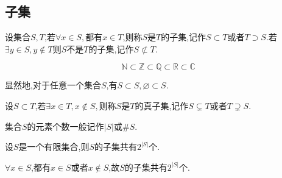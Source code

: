 \subsection{子集}
\begin{formal}
    \begin{definition}[子集的定义]\label{def:子集的定义}
        设集合$S,T$,若$\forall x\in S,$都有$x\in T$,则称$S$是$T$的子集,记作$S\subset T$或者$T\supset S$.若$\exists y\in S,y\nin T$则$S$不是$T$的子集,记作$S\not\subset T$.
    \end{definition}
\end{formal}
\begin{brown}
    \begin{example}
        \[
        \mathbb{N}\subset \mathbb{Z}\subset \mathbb{Q}\subset \mathbb{R}\subset \mathbb{C}
        \]
    \end{example}
\end{brown}
\begin{red}
    \begin{remark}
        显然地,对于任意一个集合$S$,有$S\subset S, \varnothing\subset S$.
    \end{remark}
\end{red}
\begin{formal}
\begin{definition}[真子集]\label{def:真子集}
    设$S\subset T$,若$\exists x\in T,x\nin S,$则称$S$是$T$的真子集,记作$S\subsetneq T$或者$T\supsetneq S$.
\end{definition}
\end{formal}
\begin{red}
    \begin{remark}
        集合$S$的元素个数一般记作$\left|S\right|$或$\#S$.
    \end{remark}
\end{red}
\begin{formal}
\begin{theorem}[子集数量]\label{thm:子集数量}
    设$S$是一个有限集合,则$S$的子集共有$2^{\left| S \right|}$个.
\end{theorem}
\begin{Proof}
$\forall x\in S$,都有$x\in S$或者$x\notin S$,故$S$的子集共有$2^{\left| S \right|}$个.
\end{Proof}
\end{formal}
